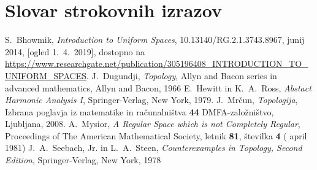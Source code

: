 \documentclass[mat1]{fmfdelo}
\begin{document}
\section*{Slovar strokovnih izrazov}


\begin{thebibliography}{99}

S.~Bhowmik, \emph{Introduction to Uniform Spaces}, 10.13140/RG.2.1.3743.8967, junij 2014, [ogled 1.~4.~2019], dostopno na \url{https://www.researchgate.net/publication/305196408_INTRODUCTION_TO_UNIFORM_SPACES}.
J.~Dugundji, \emph{Topology}, Allyn and Bacon series in advanced mathematics, Allyn and Bacon, 1966
E.~Hewitt in K.~A.~Ross, \emph{Abstact Harmonic Analysis I}, Springer-Verlag, New York, 1979.
J.~Mrčun, \emph{Topologija}, Izbrana poglavja iz matematike in računalništva \textbf{44} DMFA-založništvo, Ljubljana, 2008.
A.~Mysior, \emph{A Regular Space which is not Completely Regular}, Proceedings of The American Mathematical Society, letnik \textbf{81}, številka \textbf{4} ( april 1981)
J.~A.~Seebach, Jr. in L.~A.~Steen, \emph{Counterexamples in Topology, Second Edition}, Springer-Verlag, New York, 1978

\end{thebibliography}
\end{document}
